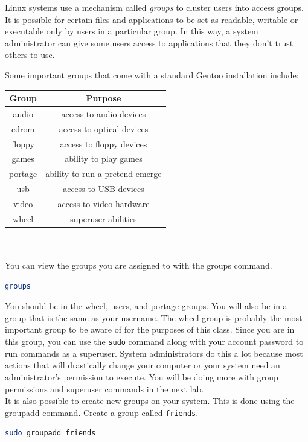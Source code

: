 \documentclass{article}
\newcommand{\sudo}{\texttt{sudo}\xspace}
\begin{document}
Linux systems use a mechanism called \textit{groups} to  cluster users into access
groups. It is possible for certain files and applications to be set as readable,
writable or executable only by users in a particular group. In this way, a
system administrator can give some users access to applications that they don't
trust others to use.

Some important groups that come with a standard Gentoo installation include:

\begin{tabular}{|c|c|}
\hline
Group & Purpose \\
\hline
audio & access to audio devices  \\
cdrom & access to optical devices \\
floppy & access to floppy devices \\
games & ability to play games \\
portage & ability to run a pretend emerge \\
usb & access to USB devices \\
video & access to video hardware \\
wheel & superuser abilities \\
 \hline
\end{tabular}\\ \\


You can view the groups you are assigned to with the groups command.

\begin{lstlisting}[language = bash]
groups
\end{lstlisting}

You should be in the wheel, users, and portage groups. You will also be in a
group that is the same as your username. The wheel group is probably the most
important group to be aware of for the purposes of this class. Since you are in
this group, you can use the \sudo command along with your account password to run
commands as a superuser. System administrators do this a lot because most
actions that will drastically change your computer or your system need an
administrator's permission to execute. You will be doing more with group
permissions and superuser commands in the next lab.\\

It is also possible to create new groups on your system. This is done using the
groupadd command. Create a group called \texttt{friends}.

\begin{lstlisting}[language = bash]
sudo groupadd friends
\end{lstlisting}
\end{document}
